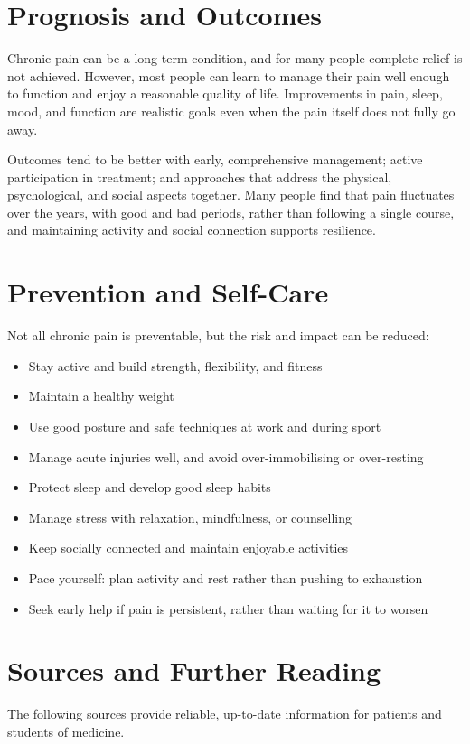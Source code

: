 \section*{Prognosis and Outcomes}
Chronic pain can be a long-term condition, and for many people complete relief is not achieved. However, most people can learn to manage their pain well enough to function and enjoy a reasonable quality of life. Improvements in pain, sleep, mood, and function are realistic goals even when the pain itself does not fully go away.

Outcomes tend to be better with early, comprehensive management; active participation in treatment; and approaches that address the physical, psychological, and social aspects together. Many people find that pain fluctuates over the years, with good and bad periods, rather than following a single course, and maintaining activity and social connection supports resilience.

\section*{Prevention and Self-Care}
Not all chronic pain is preventable, but the risk and impact can be reduced:

\begin{itemize}
    \item Stay active and build strength, flexibility, and fitness
    \item Maintain a healthy weight
    \item Use good posture and safe techniques at work and during sport
    \item Manage acute injuries well, and avoid over-immobilising or over-resting
    \item Protect sleep and develop good sleep habits
    \item Manage stress with relaxation, mindfulness, or counselling
    \item Keep socially connected and maintain enjoyable activities
    \item Pace yourself: plan activity and rest rather than pushing to exhaustion
    \item Seek early help if pain is persistent, rather than waiting for it to worsen
\end{itemize}

\section*{Sources and Further Reading}
The following sources provide reliable, up-to-date information for patients and students of medicine.

